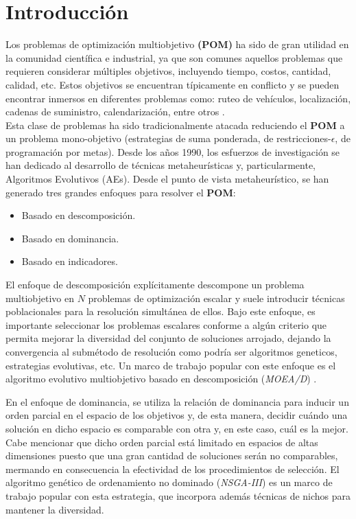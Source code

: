 \chapter{Introducción}

Los problemas de optimización multiobjetivo \textbf{(POM)} ha sido de gran utilidad en la comunidad científica e industrial, ya que son comunes aquellos problemas que requieren
considerar múltiples objetivos, incluyendo tiempo, costos, cantidad, calidad, etc. Estos objetivos se encuentran típicamente en conflicto y se pueden encontrar inmersos en
diferentes problemas como: ruteo de vehículos, localización, cadenas de suministro, calendarización, entre otros \cite{coello2004applications}.\\

Esta clase de problemas ha sido tradicionalmente atacada reduciendo el \textbf{POM} a un problema mono-objetivo (estrategias de suma ponderada, de restricciones-$\epsilon$,
de programación por metas). Desde los años 1990, los esfuerzos de investigación se han dedicado al desarrollo de técnicas metaheurísticas y, particularmente, Algoritmos Evolutivos (AEs).
Desde el punto de vista metaheurístico, se han generado tres grandes enfoques para resolver el \textbf{POM}:

\begin{itemize}
 \item Basado en descomposición.
 \item Basado en dominancia.
 \item Basado en indicadores.
\end{itemize}

El enfoque de descomposición explícitamente descompone un problema multiobjetivo en $N$ problemas de optimización escalar y suele introducir técnicas poblacionales para
la resolución simultánea de ellos. Bajo este enfoque, es importante seleccionar los problemas escalares conforme a algún criterio que permita mejorar la diversidad del conjunto
de soluciones arrojado, dejando la convergencia al submétodo de resolución como podría ser algoritmos geneticos, estrategias evolutivas, etc. Un marco de trabajo popular con este enfoque es el algoritmo evolutivo multiobjetivo basado en
descomposición (\emph{MOEA/D}) \cite{4358754}.
\newline

En el enfoque de dominancia, se utiliza la relación de dominancia para inducir un orden parcial en el espacio de los objetivos y, de esta manera, decidir cuándo una solución
en dicho espacio es comparable con otra y, en este caso, cuál es la mejor. Cabe mencionar que dicho orden parcial está limitado en espacios de altas dimensiones puesto que una gran
cantidad de soluciones serán no comparables, mermando en consecuencia la efectividad de los procedimientos de selección. El algoritmo genético de ordenamiento no dominado
(\emph{NSGA-III}) \cite{6600851} es un marco de trabajo popular con esta estrategia, que incorpora además técnicas de nichos para mantener la diversidad.
\newline


